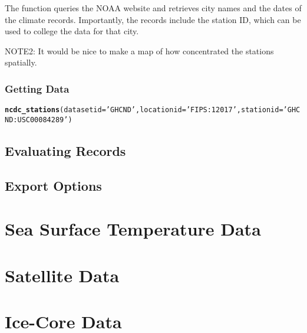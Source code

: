 \documentclass{article}\usepackage[]{graphicx}\usepackage[]{color}
\makeatletter
\newcommand{\hlstr}[1]{\textcolor[rgb]{0.192,0.494,0.8}{#1}}%
\newcommand{\hlstd}[1]{\textcolor[rgb]{0.345,0.345,0.345}{#1}}%
\newcommand{\hlkwc}[1]{\textcolor[rgb]{0.333,0.667,0.333}{#1}}%
\newcommand{\hlkwd}[1]{\textcolor[rgb]{0.737,0.353,0.396}{\textbf{#1}}}%
\newenvironment{kframe}{%
 \def\at@end@of@kframe{}%
 \ifinner\ifhmode%
  \def\at@end@of@kframe{\end{minipage}}%
  \begin{minipage}{\columnwidth}%
 \fi\fi%
 \def\FrameCommand##1{\hskip\@totalleftmargin \hskip-\fboxsep
 \colorbox{shadecolor}{##1}\hskip-\fboxsep
     \hskip-\linewidth \hskip-\@totalleftmargin \hskip\columnwidth}%
 \MakeFramed {\advance\hsize-\width
   \@totalleftmargin\z@ \linewidth\hsize
   \@setminipage}}%
 {\par\unskip\endMakeFramed%
 \at@end@of@kframe}
\newenvironment{knitrout}{}{} %
\makeatother
\begin{document}
The function queries the NOAA website and retrieves city names and the dates of the climate records. Importantly, the records include the station ID, which can be used to college the data for that city. 


NOTE2: It would be nice to make a map of how concentrated the stations spatially. 

\subsubsection{Getting Data}

\begin{knitrout}
\color{fgcolor}\begin{kframe}
\begin{alltt}
\hlkwd{ncdc_stations}\hlstd{(}\hlkwc{datasetid}\hlstd{=}\hlstr{'GHCND'}\hlstd{,} \hlkwc{locationid}\hlstd{=}\hlstr{'FIPS:12017'}\hlstd{,} \hlkwc{stationid}\hlstd{=}\hlstr{'GHCND:USC00084289'}\hlstd{)}
\end{alltt}


{\ttfamily\noindent\bfseries{}}\end{kframe}
\end{knitrout}

\subsection{Evaluating Records}

\subsection{Export Options}

\section{Sea Surface Temperature Data}

\section{Satellite Data}

\section{Ice-Core Data}
\end{document}
